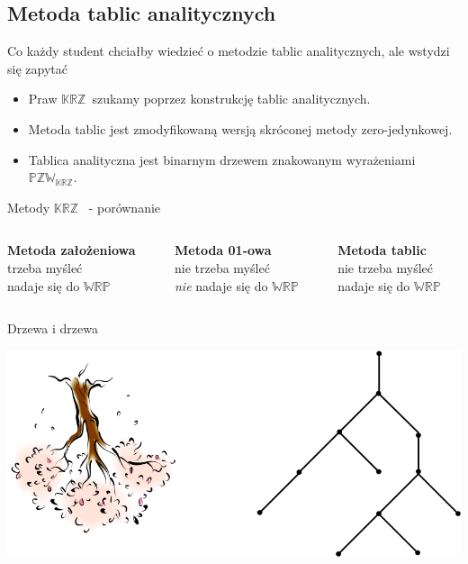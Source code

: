 \documentclass{beamer}
\newcommand {\KRZ} {\ensuremath{\mathbb{KRZ}}}
\newcommand {\PZWKRZ} {\ensuremath{\mathbb{PZW_{KRZ}}}}
\newcommand {\WRP} {\ensuremath{\mathbb{WRP}}}
\begin{document}
\subsection{Metoda tablic analitycznych}

\begin{frame}{Co każdy student chciałby wiedzieć o metodzie tablic analitycznych, ale wstydzi się zapytać}
%
\begin{itemize}
\item Praw \KRZ ~szukamy poprzez konstrukcję tablic analitycznych.\\
%
\item Metoda tablic jest zmodyfikowaną wersją skróconej metody zero-jedynkowej.\\
%
\item Tablica analityczna  jest binarnym drzewem znakowanym wyrażeniami \PZWKRZ.
\end{itemize}
\end{frame}

\begin{frame}{Metody \KRZ~ - porównanie}
\begin{columns}[t]
\begin{column}{4cm}
\textbf{Metoda założeniowa} \\ \textcolor[rgb]{1.00,0.00,0.00}{trzeba myśleć} \\ \textcolor[rgb]{0.00,1.00,0.00}{nadaje się do} \WRP \\
\end{column}
\begin{column}{4cm}
\textbf{Metoda 01-owa} \\ \textcolor[rgb]{0.00,1.00,0.00}{nie trzeba myśleć} \\ \textcolor[rgb]{0.98,0.00,0.00}{\emph{nie} nadaje się} do \WRP
\end{column}
\begin{column}{4cm}
\textbf{Metoda tablic} \\ \textcolor[rgb]{0.00,1.00,0.00}{nie trzeba myśleć}  \\ \textcolor[rgb]{0.00,1.00,0.00}{nadaje się do} \WRP
\end{column}
\end{columns}
\end{frame}


\begin{frame}{Drzewa i drzewa}
%
\begin{center}
\includegraphics[width=6 cm]{../pliki_wlasne/drzewo0.jpg}\\
\end{center}
\end{frame}
\end{document}
